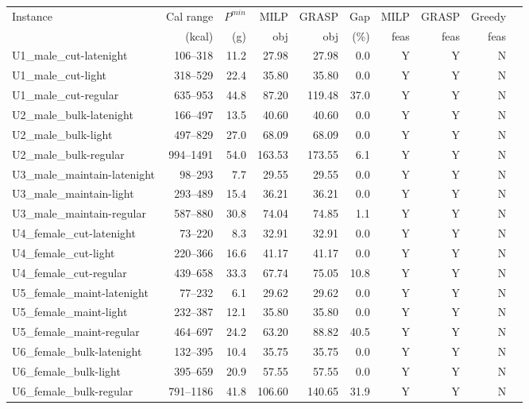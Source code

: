 \begin{tabular}{lrrrrrrrrr}
\toprule
Instance & Cal range & $P^{min}$ & MILP & GRASP & Gap & MILP & GRASP & Greedy \\
        & (kcal)    & (g)       & obj  & obj   & (\%) & feas & feas  & feas   \\
\midrule
U1\_male\_cut-latenight & 106--318 & 11.2 & 27.98 & 27.98 & 0.0 & Y & Y & N \\
U1\_male\_cut-light & 318--529 & 22.4 & 35.80 & 35.80 & 0.0 & Y & Y & N \\
U1\_male\_cut-regular & 635--953 & 44.8 & 87.20 & 119.48 & 37.0 & Y & Y & N \\
U2\_male\_bulk-latenight & 166--497 & 13.5 & 40.60 & 40.60 & 0.0 & Y & Y & N \\
U2\_male\_bulk-light & 497--829 & 27.0 & 68.09 & 68.09 & 0.0 & Y & Y & N \\
U2\_male\_bulk-regular & 994--1491 & 54.0 & 163.53 & 173.55 & 6.1 & Y & Y & N \\
U3\_male\_maintain-latenight & 98--293 & 7.7 & 29.55 & 29.55 & 0.0 & Y & Y & N \\
U3\_male\_maintain-light & 293--489 & 15.4 & 36.21 & 36.21 & 0.0 & Y & Y & N \\
U3\_male\_maintain-regular & 587--880 & 30.8 & 74.04 & 74.85 & 1.1 & Y & Y & N \\
U4\_female\_cut-latenight & 73--220 & 8.3 & 32.91 & 32.91 & 0.0 & Y & Y & N \\
U4\_female\_cut-light & 220--366 & 16.6 & 41.17 & 41.17 & 0.0 & Y & Y & N \\
U4\_female\_cut-regular & 439--658 & 33.3 & 67.74 & 75.05 & 10.8 & Y & Y & N \\
U5\_female\_maint-latenight & 77--232 & 6.1 & 29.62 & 29.62 & 0.0 & Y & Y & N \\
U5\_female\_maint-light & 232--387 & 12.1 & 35.80 & 35.80 & 0.0 & Y & Y & N \\
U5\_female\_maint-regular & 464--697 & 24.2 & 63.20 & 88.82 & 40.5 & Y & Y & N \\
U6\_female\_bulk-latenight & 132--395 & 10.4 & 35.75 & 35.75 & 0.0 & Y & Y & N \\
U6\_female\_bulk-light & 395--659 & 20.9 & 57.55 & 57.55 & 0.0 & Y & Y & N \\
U6\_female\_bulk-regular & 791--1186 & 41.8 & 106.60 & 140.65 & 31.9 & Y & Y & N \\
\bottomrule
\end{tabular}